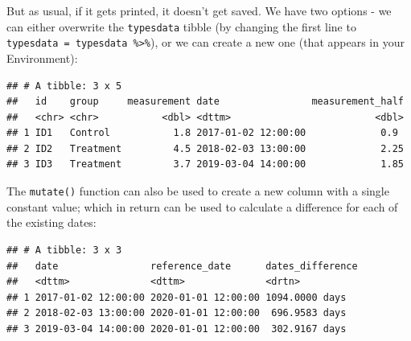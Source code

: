 \documentclass[
  12pt,
  krantz2]{krantz}
\makeatletter
\newenvironment{Shaded}{\begin{snugshade}}{\end{snugshade}}
\newcommand{\DataTypeTok}[1]{\textcolor[rgb]{0.13,0.29,0.53}{#1}}
\newcommand{\DecValTok}[1]{\textcolor[rgb]{0.00,0.00,0.81}{#1}}
\newcommand{\KeywordTok}[1]{\textcolor[rgb]{0.13,0.29,0.53}{\textbf{#1}}}
\newcommand{\NormalTok}[1]{#1}
\newcommand{\OperatorTok}[1]{\textcolor[rgb]{0.81,0.36,0.00}{\textbf{#1}}}
\newcommand{\StringTok}[1]{\textcolor[rgb]{0.31,0.60,0.02}{#1}}
\newenvironment{kframe}{%
\medskip{}
\setlength{\fboxsep}{.8em}
 \def\at@end@of@kframe{}%
 \ifinner\ifhmode%
  \def\at@end@of@kframe{\end{minipage}}%
  \begin{minipage}{\columnwidth}%
 \fi\fi%
 \def\FrameCommand##1{\hskip\@totalleftmargin \hskip-\fboxsep
 \colorbox{shadecolor}{##1}\hskip-\fboxsep
     \hskip-\linewidth \hskip-\@totalleftmargin \hskip\columnwidth}%
 \MakeFramed {\advance\hsize-\width
   \@totalleftmargin\z@ \linewidth\hsize
   \@setminipage}}%
 {\par\unskip\endMakeFramed%
 \at@end@of@kframe}
\renewenvironment{Shaded}{\begin{kframe}}{\end{kframe}}
\makeatother
\begin{document}
But as usual, if it gets printed, it doesn't get saved.
We have two options - we can either overwrite the \texttt{typesdata} tibble (by changing the first line to \texttt{typesdata\ =\ typesdata\ \%\textgreater{}\%}), or we can create a new one (that appears in your Environment):

\begin{Shaded}
\end{Shaded}

\begin{verbatim}
## # A tibble: 3 x 5
##   id    group     measurement date                measurement_half
##   <chr> <chr>           <dbl> <dttm>                         <dbl>
## 1 ID1   Control           1.8 2017-01-02 12:00:00             0.9 
## 2 ID2   Treatment         4.5 2018-02-03 13:00:00             2.25
## 3 ID3   Treatment         3.7 2019-03-04 14:00:00             1.85
\end{verbatim}

The \texttt{mutate()} function can also be used to create a new column with a single constant value; which in return can be used to calculate a difference for each of the existing dates:

\begin{Shaded}
\end{Shaded}

\begin{verbatim}
## # A tibble: 3 x 3
##   date                reference_date      dates_difference
##   <dttm>              <dttm>              <drtn>          
## 1 2017-01-02 12:00:00 2020-01-01 12:00:00 1094.0000 days  
## 2 2018-02-03 13:00:00 2020-01-01 12:00:00  696.9583 days  
## 3 2019-03-04 14:00:00 2020-01-01 12:00:00  302.9167 days
\end{verbatim}
\end{document}
